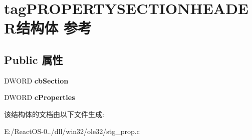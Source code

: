 \hypertarget{structtag_p_r_o_p_e_r_t_y_s_e_c_t_i_o_n_h_e_a_d_e_r}{}\section{tag\+P\+R\+O\+P\+E\+R\+T\+Y\+S\+E\+C\+T\+I\+O\+N\+H\+E\+A\+D\+E\+R结构体 参考}
\label{structtag_p_r_o_p_e_r_t_y_s_e_c_t_i_o_n_h_e_a_d_e_r}
\subsection*{Public 属性}
\begin{DoxyCompactItemize}
\item 
\mbox{\label{structtag_p_r_o_p_e_r_t_y_s_e_c_t_i_o_n_h_e_a_d_e_r_ad942e165bbeafd250d9e2b3c8e28ba30}} 
D\+W\+O\+RD {\bfseries cb\+Section}
\item 
\mbox{\label{structtag_p_r_o_p_e_r_t_y_s_e_c_t_i_o_n_h_e_a_d_e_r_a43eff5954ee3fce520f0b1443c1b27b4}} 
D\+W\+O\+RD {\bfseries c\+Properties}
\end{DoxyCompactItemize}


该结构体的文档由以下文件生成\+:\begin{DoxyCompactItemize}
\item 
E\+:/\+React\+O\+S-\/0../dll/win32/ole32/stg\+\_\+prop.\+c\end{DoxyCompactItemize}
